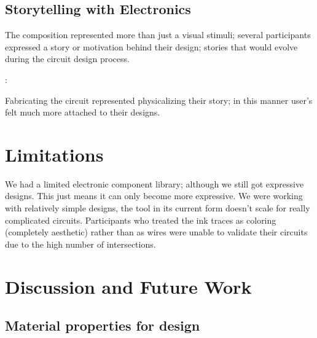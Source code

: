 \documentclass{sigchi}
\begin{document}
\subsection{Storytelling with Electronics}
  The composition represented more than just a visual stimuli; several participants expressed a story or motivation behind their design; stories that would evolve during the circuit design process.
  \begin{myquote}
   \vspace{-2pt}
    :
    \vspace{-2pt}
  \end{myquote}
  Fabricating the circuit represented physicalizing their story; in this manner user's felt much more attached to their designs.
  

\section{Limitations}
  We had a limited electronic component library; although we still got expressive designs. This just means it can only become more expressive. We were working with relatively simple designs, the tool in its current form doesn't scale for really complicated circuits. Participants who treated the ink traces as coloring (completely aesthetic) rather than as wires were unable to validate their circuits due to the high number of intersections.


\section {Discussion and Future Work}

\subsection{Material properties for design}
\end{document}
